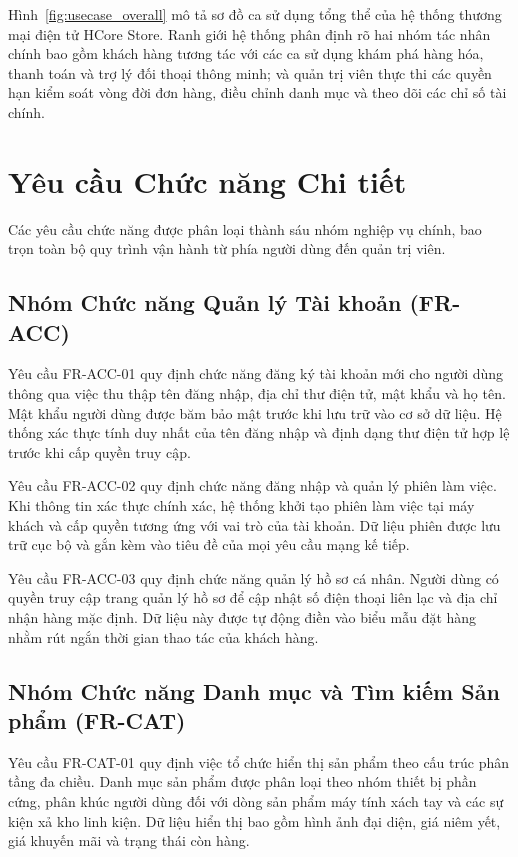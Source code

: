 Hình~\ref{fig:usecase_overall} mô tả sơ đồ ca sử dụng tổng thể của hệ thống thương mại điện tử HCore Store. Ranh giới hệ thống phân định rõ hai nhóm tác nhân chính bao gồm khách hàng tương tác với các ca sử dụng khám phá hàng hóa, thanh toán và trợ lý đối thoại thông minh; và quản trị viên thực thi các quyền hạn kiểm soát vòng đời đơn hàng, điều chỉnh danh mục và theo dõi các chỉ số tài chính.

\section{Yêu cầu Chức năng Chi tiết}
Các yêu cầu chức năng được phân loại thành sáu nhóm nghiệp vụ chính, bao trọn toàn bộ quy trình vận hành từ phía người dùng đến quản trị viên.

\subsection{Nhóm Chức năng Quản lý Tài khoản (FR-ACC)}
Yêu cầu FR-ACC-01 quy định chức năng đăng ký tài khoản mới cho người dùng thông qua việc thu thập tên đăng nhập, địa chỉ thư điện tử, mật khẩu và họ tên. Mật khẩu người dùng được băm bảo mật trước khi lưu trữ vào cơ sở dữ liệu. Hệ thống xác thực tính duy nhất của tên đăng nhập và định dạng thư điện tử hợp lệ trước khi cấp quyền truy cập.

Yêu cầu FR-ACC-02 quy định chức năng đăng nhập và quản lý phiên làm việc. Khi thông tin xác thực chính xác, hệ thống khởi tạo phiên làm việc tại máy khách và cấp quyền tương ứng với vai trò của tài khoản. Dữ liệu phiên được lưu trữ cục bộ và gắn kèm vào tiêu đề của mọi yêu cầu mạng kế tiếp.

Yêu cầu FR-ACC-03 quy định chức năng quản lý hồ sơ cá nhân. Người dùng có quyền truy cập trang quản lý hồ sơ để cập nhật số điện thoại liên lạc và địa chỉ nhận hàng mặc định. Dữ liệu này được tự động điền vào biểu mẫu đặt hàng nhằm rút ngắn thời gian thao tác của khách hàng.

\subsection{Nhóm Chức năng Danh mục và Tìm kiếm Sản phẩm (FR-CAT)}
Yêu cầu FR-CAT-01 quy định việc tổ chức hiển thị sản phẩm theo cấu trúc phân tầng đa chiều. Danh mục sản phẩm được phân loại theo nhóm thiết bị phần cứng, phân khúc người dùng đối với dòng sản phẩm máy tính xách tay và các sự kiện xả kho linh kiện. Dữ liệu hiển thị bao gồm hình ảnh đại diện, giá niêm yết, giá khuyến mãi và trạng thái còn hàng.

